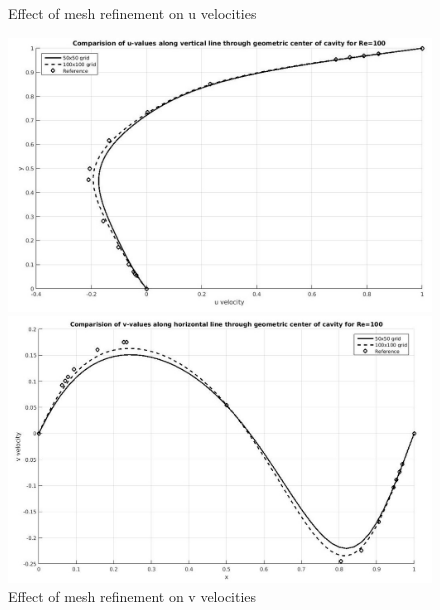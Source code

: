 \documentclass[12pt]{elsarticle}
\begin{document}
	\begin{figure}[h]
		\caption{Effect of mesh refinement on u velocities}
		\centering\includegraphics[width=1.0\linewidth]{15_uvel_mesh_comparision}
		\caption{Effect of mesh refinement on v velocities}
		\centering\includegraphics[width=1.0\linewidth]{16_vvel_mesh_comparision}
	\end{figure}
	
\end{document}
